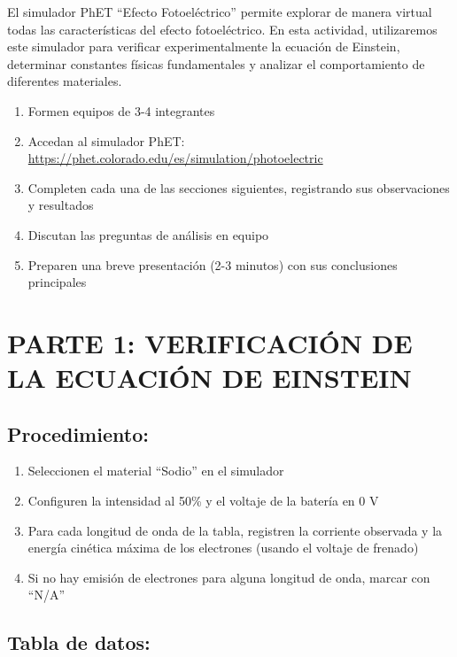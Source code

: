 \documentclass[12pt,a4paper]{article}
\begin{document}
	El simulador PhET ``Efecto Fotoeléctrico'' permite explorar de manera virtual todas las características del efecto fotoeléctrico. En esta actividad, utilizaremos este simulador para verificar experimentalmente la ecuación de Einstein, determinar constantes físicas fundamentales y analizar el comportamiento de diferentes materiales.
	
	\begin{instruccionbox}
		\begin{enumerate}
			\item Formen equipos de 3-4 integrantes
			\item Accedan al simulador PhET: \url{https://phet.colorado.edu/es/simulation/photoelectric}
			\item Completen cada una de las secciones siguientes, registrando sus observaciones y resultados
			\item Discutan las preguntas de análisis en equipo
			\item Preparen una breve presentación (2-3 minutos) con sus conclusiones principales
		\end{enumerate}
	\end{instruccionbox}
	
	\newpage
	
	\section{PARTE 1: VERIFICACIÓN DE LA ECUACIÓN DE EINSTEIN}
	
	\subsection{Procedimiento:}
	\begin{enumerate}
		\item Seleccionen el material ``Sodio'' en el simulador
		\item Configuren la intensidad al 50\% y el voltaje de la batería en 0 V
		\item Para cada longitud de onda de la tabla, registren la corriente observada y la energía cinética máxima de los electrones (usando el voltaje de frenado)
		\item Si no hay emisión de electrones para alguna longitud de onda, marcar con ``N/A''
	\end{enumerate}
	
	\subsection{Tabla de datos:}
	
\end{document}
